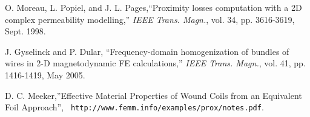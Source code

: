 
\begin{thebibliography}{10}

 O. Moreau, L. Popiel, and J. L. Pages,``Proximity losses computation with
a 2D complex permeability modelling,'' \emph{IEEE Trans. Magn.}, vol. 34, pp. 3616-3619, Sept. 1998.

 J. Gyselinck and P. Dular, ``Frequency-domain
homogenization of bundles of wires in 2-D magnetodynamic FE
calculations,'' \emph{IEEE Trans. Magn.}, vol. 41, pp. 1416-1419,
May 2005.

D. C. Meeker,''Effective Material Properties of Wound Coils from an Equivalent Foil Approach'', {\tt
http://www.femm.info/examples/prox/notes.pdf}.



\end{thebibliography}

